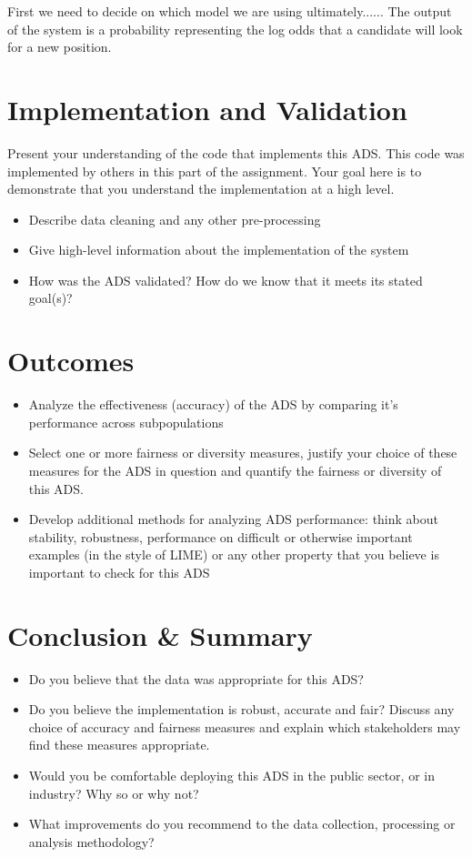 \documentclass[11pt]{article}
\begin{document}
First we need to decide on which model we are using ultimately......  The output of the system is a probability representing the log odds that a candidate will look for a new position.

\pagebreak

\section{Implementation and Validation}
Present your understanding of the code that implements this ADS.  This code was implemented by others in this part of the assignment.  Your goal here is to demonstrate that you understand the implementation at a high level.
\begin{itemize}
\item Describe data cleaning and any other pre-processing
\item Give high-level information about the implementation of the system
\item How was the ADS validated?  How do we know that it meets its stated goal(s)?
\end{itemize}

\pagebreak

\section{Outcomes}

\begin{itemize}
\item Analyze the effectiveness (accuracy) of the ADS by comparing it's performance across subpopulations
\item Select one or more fairness or diversity measures, justify your choice of these measures for the ADS in question and quantify the fairness or diversity of this ADS.
\item Develop additional methods for analyzing ADS performance: think about stability, robustness, performance on difficult or otherwise important examples (in the style of LIME) or any other property that you believe is important to check for this ADS
\end{itemize}

\pagebreak

\section{Conclusion \& Summary}
\begin{itemize}
\item Do you believe that the data was appropriate for this ADS?  
\item Do you believe the implementation is robust, accurate and fair?  Discuss any choice of accuracy and fairness measures and explain which stakeholders may find these measures appropriate.
\item Would you be comfortable deploying this ADS in the public sector, or in industry?  Why so or why not?
\item What improvements do you recommend to the data collection, processing or analysis methodology?
\end{itemize}

\end{document}
